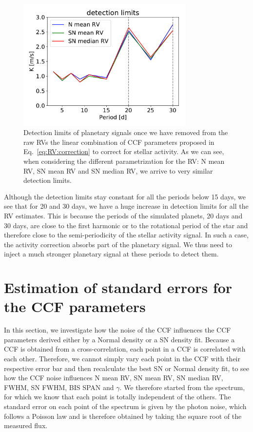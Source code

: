\documentclass{aa}
\begin{document}
\begin{figure}[!h]
\begin{center}
\includegraphics[height = 2.6in]{detection_limits.pdf} 
   \caption{Detection limits of planetary signals once we have removed from the raw RVs the linear combination of CCF parameters proposed in Eq.~\ref{eq:RV:correction} to correct for stellar activity. As we can see, when considering the different parametrization for the RV: N mean RV, SN mean RV and SN median RV, we arrive to very similar detection limits.}
   \label{fig:detection_limits}
\end{center}
\end{figure}

Although the detection limits stay constant for all the periods below 15 days, we see that for 20 and 30 days, we have a huge increase in detection limits for all the RV estimates. 
This is because the periods of the simulated planets, 20 days and 30 days, are close to the first harmonic or to the rotational period of the star \citep[36.7 days,][]{Dumusque-2012}
and therefore close to the semi-periodicity of the stellar activity signal. In such a case, the activity 
correction absorbs part of the planetary signal. We thus need to inject a much stronger planetary signal at these periods to detect them.


\section{Estimation of standard errors for the CCF parameters} \label{sec:5}

In this section, we investigate how the noise of the CCF influences the CCF parameters derived either by a Normal density or a SN density fit. Because a CCF is obtained from a cross-correlation, each point in a CCF is correlated with each other. Therefore, we cannot simply vary each point in the CCF with their respective error bar and then recalculate the best SN or Normal density fit, to see how the CCF noise influences N mean RV, SN mean RV, SN median RV, FWHM, SN FWHM, BIS SPAN and $\gamma$. We therefore started from the spectrum, for which we know that each point is totally independent of the others. The standard error on each point of the spectrum is given by the photon noise, which follows a Poisson law and is therefore obtained by taking the square root of the measured flux.
\end{document}
